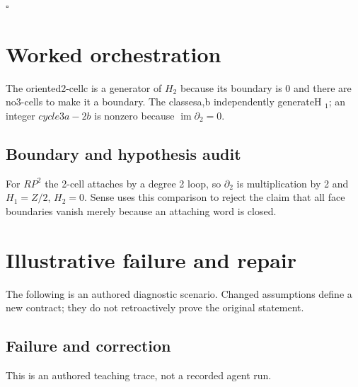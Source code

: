 \documentclass[preprint,12pt,aps,pra,showkeys,amsmath,amssymb,superscriptaddress,floatfix]{revtex4-2}
\theoremstyle{definition}
\theoremstyle{remark}
\begin{document}
\hfill$\square$

\section{Worked orchestration}

The oriented2-cellc is a generator of \(H_{2}\) because its boundary is
0 and there are no3-cells to make it a boundary. The classesa,b
independently generateH \(_{1}\); an integer \(cycle3a-2b\) is nonzero
because \(\operatorname{im} \partial _{2}=0\).

\subsection{Boundary and hypothesis audit}

For \(RP^{2}\) the 2-cell attaches by a degree 2 loop, so
\(\partial _{2}\) is multiplication by 2 and \(H_{1}=Z/2\), \(H_{2}=0\).
Sense uses this comparison to reject the claim that all face boundaries
vanish merely because an attaching word is closed.

\section{Illustrative failure and repair}

The following is an authored diagnostic scenario. Changed assumptions
define a new contract; they do not retroactively prove the original
statement.

\subsection{Failure and correction}
This is an authored teaching trace, not a recorded agent run.
\end{document}
